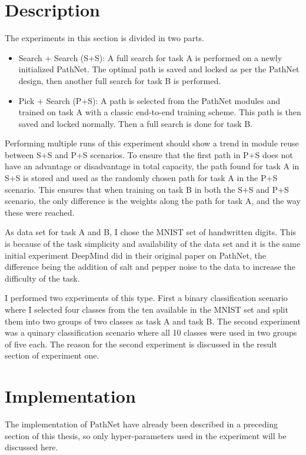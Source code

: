 \section{Description}
The experiments in this section is divided in two parts. 
\begin{itemize}
    \item Search + Search (S+S): A full search for task A is performed on a newly initialized PathNet. The optimal path is saved and locked as per the PathNet design, then another full search for task B is performed.
    \item Pick + Search (P+S): A path is selected from the PathNet modules and trained on task A with a classic end-to-end training scheme. This path is then saved and locked normally. Then a full search is done for task B.
\end{itemize}
Performing multiple runs of this experiment should show a trend in module reuse between S+S and P+S scenarios. To ensure that the first path in P+S does not have an advantage or disadvantage in total capacity,  the path found for task A in S+S is stored and used as the randomly chosen path for task A in the P+S scenario.
This ensures that when training on task B in both the S+S and P+S scenario, the only difference is the weights along the path for task A, and the way these were reached. 

As data set for task A and B, I chose the MNIST set of handwritten digits. This is because of the task simplicity and availability of the data set and it is the same initial experiment DeepMind did in their original paper on PathNet, the difference being the addition of salt and pepper noise to the data to increase the difficulty of the task.

I performed two experiments of this type. First a binary classification scenario where I selected four classes from the ten available in the MNIST set and split them into two groups of two classes as task A and task B. The second experiment was a quinary classification scenario where all 10 classes were used in two groups of five each. The reason for the second experiment is discussed in the result section of experiment one. 

\section{Implementation}
The implementation of PathNet have already been described in a preceding section of this thesis, so only hyper-parameters used in the experiment will be discussed here.

